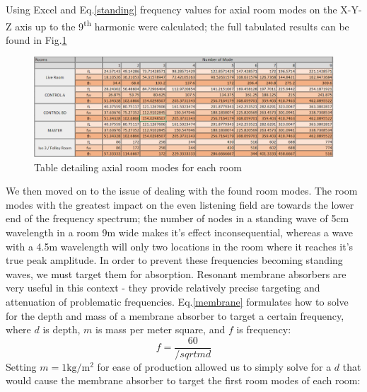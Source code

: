 \documentclass[10pt, twocolumn]{article}
\begin{document}
        Using Excel and Eq.\ref{standing} frequency values for axial room modes on the X-Y-Z axis up to the 9\textsuperscript{th} harmonic were calculated; the full tabulated results can be found in Fig.\ref{modes}
        \begin{figure}[h]
            \includegraphics[scale=0.6]{resources/modes.png}
            \caption{Table detailing axial room modes for each room}
            \label{modes}
            \centering
        \end{figure}
        We then moved on to the issue of dealing with the found room modes.
        The room modes with the greatest impact on the even listening field are towards the lower end of the frequency spectrum; the number of nodes in a standing wave of 5cm wavelength in a room 9m wide makes it's effect inconsequential, whereas a wave with a 4.5m wavelength will only two locations in the room where it reaches it's true peak amplitude.
        In order to prevent these frequencies becoming standing waves, we must target them for absorption.
        Resonant membrane absorbers are very useful in this context - they provide relatively precise targeting and attenuation of problematic frequencies.
        Eq.\ref{membrane} formulates how to solve for the depth and mass of a membrane absorber to target a certain frequency, where $d$ is depth, $m$ is mass per meter square, and $f$ is frequency:
        \begin{equation}\label{membrane}
            f = \frac{60}{/sqrt{md}}
        \end{equation}
        Setting $m=1\si{\kilogram\per\meter\squared}$ for ease of production allowed us to simply solve for a $d$ that would cause the membrane absorber to target the first room modes of each room:
\end{document}
